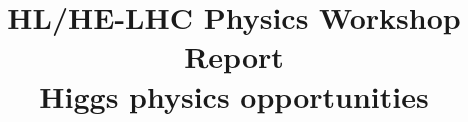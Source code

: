 \documentclass[11pt,twoside,a4paper]{cernrep}
\def\bibfiles{\main/bib/chapter,\main/section1/bib/section,\main/section2/bib/section,\main/section3/bib/section,\main/section4/bib/section,\main/section5/bib/section,\main/section6/bib/section,\main/section7/bib/section,\main/section8/bib/section,\main/section9/bib/section,\main/section10/bib/section}
\providecommand{\biblio}{\nocite{article-minimal}\clearpage}  %
\begin{document}

\def\lra#1{\overset{\text{\scriptsize$\leftrightarrow$}}{#1}}

\def\biblio{}

\title{HL/HE-LHC Physics Workshop Report \\[5mm]
  Higgs physics opportunities}

% 
%
% 

\maketitle
% 
%
% 
\begin{abstract}






\end{abstract}

\setcounter{tocdepth}{3}
\tableofcontents
\newpage


\newpage

\newpage

\newpage

\newpage

\newpage

\newpage

\newpage

\newpage

\newpage

\newpage





\end{document}
